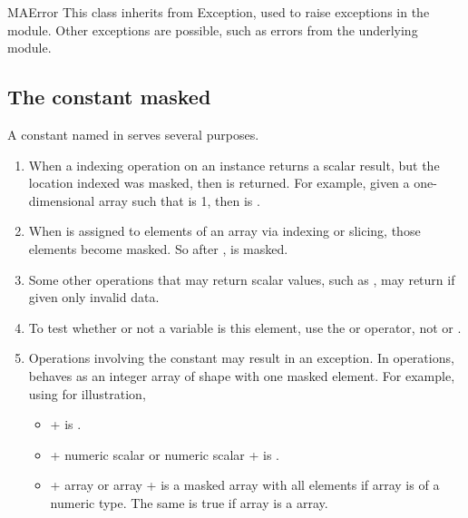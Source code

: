 \begin{classdesc}{MAError}
   This class inherits from Exception, used to raise exceptions in the
    module. Other exceptions are possible, such as errors from the
   underlying \module{\numarray} module.
\end{classdesc}


\subsection{The constant masked}
\label{sec:numarray.ma:constant-masked}

A constant named  in
 serves several purposes.
\begin{enumerate}
\item When a indexing operation on an  instance returns a
   scalar result, but the location indexed was masked, then 
   is returned. For example, given a one-dimensional array  such that
    is 1, then  is .
\item When  is assigned to elements of an array via indexing
   or slicing, those elements become masked. So after ,
    is masked.
\item Some other operations that may return scalar values, such as
   , may return  if given only invalid data.
\item To test whether or not a variable is this element, use the 
   or  operator, not \code{==} or \code{!=}.
\item Operations involving the constant  may result in an
   exception.  In operations,  behaves as an integer array of
   shape \code{()} with one masked element. For example, using \code{+} for
   illustration,
   \begin{itemize}
   \item {} +  is .
   \item {} + numeric scalar or numeric scalar +
       is .
   \item {} + array or array +  is a masked
      array with all elements  if array is of a numeric type.
      The same is true if array is a \module{\numarray} array.
   \end{itemize}
\end{enumerate}



